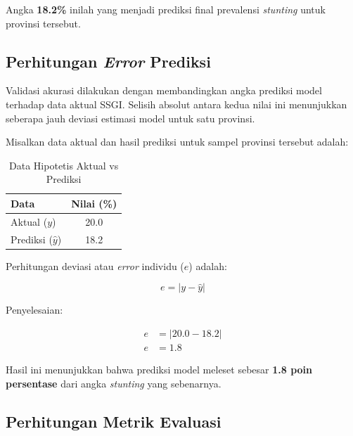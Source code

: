 Angka \textbf{18.2\%} inilah yang menjadi prediksi final prevalensi \textit{stunting} untuk provinsi tersebut.

\subsection{Perhitungan \textit{Error} Prediksi}

Validasi akurasi dilakukan dengan membandingkan angka prediksi model terhadap data aktual SSGI. Selisih absolut antara kedua nilai ini menunjukkan seberapa jauh deviasi estimasi model untuk satu provinsi.

Misalkan data aktual dan hasil prediksi untuk sampel provinsi tersebut adalah:

\begin{table}[H]
    \centering
    \renewcommand{\arraystretch}{1.3}
    \caption{Data Hipotetis Aktual vs Prediksi}
    \label{tab:error_single_dummy}
    \begin{tabular}{lc}
    \toprule
    \textbf{Data} & \textbf{Nilai (\%)} \\
    \midrule
    Aktual ($y$) & 20.0 \\
    Prediksi ($\hat{y}$) & 18.2 \\
    \bottomrule
    \end{tabular}
\end{table}

Perhitungan deviasi atau \textit{error} individu ($e$) adalah:

\par\vspace{0.8cm}
\[
   e = |y - \hat{y}|
\]
\par\vspace{0.8cm}

\noindent Penyelesaian:
\par\vspace{0.2cm}
\begin{align*}
    e &= |20.0 - 18.2| \\[0.3cm]
    e &= \mathbf{1.8}
\end{align*}
\par\vspace{0.5cm}

Hasil ini menunjukkan bahwa prediksi model meleset sebesar \textbf{1.8 poin persentase} dari angka \textit{stunting} yang sebenarnya.

\subsection{Perhitungan Metrik Evaluasi}

